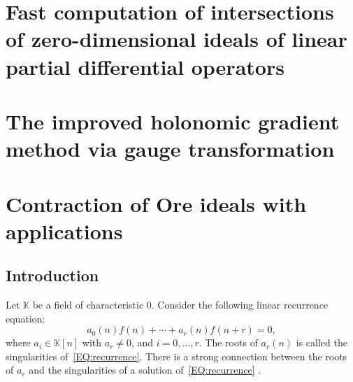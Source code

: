 \documentclass[10pt,a4paper]{article}
\newcommand{\bK}{ {\mathbb  K}}
\begin{document}
\section*{Fast computation of intersections of zero-dimensional ideals of linear partial differential operators} \label{SECT:lclm}

\section*{The improved holonomic gradient method via gauge transformation} \label{SECT:hgm}


\section{Contraction of Ore ideals with applications} \label{SECT:contraction}

\subsection{Introduction}
Let $\bK$ be a field of characteristic $0$. 
Consider the following linear recurrence equation:
\begin{equation} \label{EQ:recurrence}
 a_0(n)f(n) + \cdots + a_r(n)f(n+r)=0,
\end{equation}
where $a_i \in \bK[n]$ with $a_r \neq 0$, and $i = 0, \ldots, r$. The roots of $a_r(n)$ is called 
the singularities of~\eqref{EQ:recurrence}.  
There is a strong connection between the roots of $a_r$ 
and the singularities of a solution of~\eqref{EQ:recurrence} . 
\end{document}
